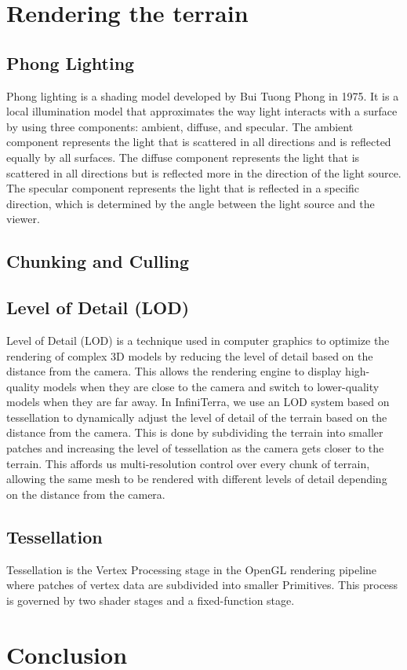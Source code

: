 \documentclass{report}
\begin{document}
\chapter{Rendering the terrain}
\label{ch:rendering-the-terrain}
\section{Phong Lighting}
Phong lighting is a shading model developed by Bui Tuong Phong in 1975. It is a local illumination model that approximates the way light interacts with a surface by using three components: ambient, diffuse, and specular.
The ambient component represents the light that is scattered in all directions and is reflected equally by all surfaces.
The diffuse component represents the light that is scattered in all directions but is reflected more in the direction of the light source.
The specular component represents the light that is reflected in a specific direction, which is determined by the angle between the light source and the viewer.

\section*{Chunking and Culling}
\section*{Level of Detail (LOD)}
Level of Detail (LOD) is a technique used in computer graphics to optimize the rendering of complex 3D models by reducing the level of detail based on the distance from the camera.
This allows the rendering engine to display high-quality models when they are close to the camera and switch to lower-quality models when they are far away.
In InfiniTerra, we use an LOD system based on tessellation to dynamically adjust the level of detail of the terrain based on the distance from the camera.
This is done by subdividing the terrain into smaller patches and increasing the level of tessellation as the camera gets closer to the terrain.
This affords us multi-resolution control over every chunk of terrain, allowing the same mesh to be rendered with different levels of detail depending on the distance from the camera.
\section*{Tessellation}
Tessellation is the Vertex Processing stage in the OpenGL rendering pipeline where patches of vertex data are subdivided into smaller Primitives. This process is governed by two shader stages and a fixed-function stage. 
\lipsum[3-4]

\chapter{Conclusion}
\label{ch:conclusion}
\lipsum[7-8]



\end{document}
